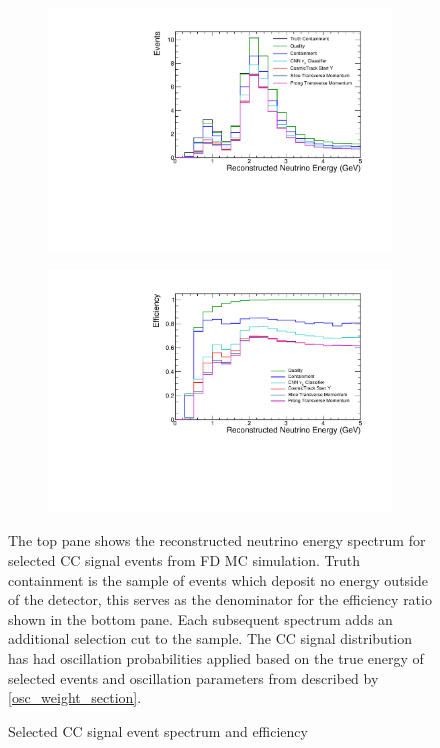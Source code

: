 \begin{figure}
\vspace{-30pt}
\begin{center}
  \begin{subfigure}[b]{0.7\textwidth}
    \centering
    \includegraphics[width=\textwidth]{figures/selection/myflow_sig_osc.pdf}
  \end{subfigure}

  \begin{subfigure}[b]{0.7\textwidth}
    \centering
    \includegraphics[width=\textwidth]{figures/selection/myflow_sig_eff_osc.pdf}
  \end{subfigure}

\end{center}
\vspace{-10pt}
\caption{Selected \numu CC signal event spectrum and efficiency}{
The top pane shows the reconstructed neutrino energy spectrum
for selected \numu CC signal events from FD MC simulation.
Truth containment is the sample of events which deposit
no energy outside of the detector, this serves as the denominator
for the efficiency ratio shown in the bottom pane.
Each subsequent spectrum adds an additional selection cut to the sample.
The \numu CC signal distribution has had oscillation probabilities applied
based on the true energy of selected events and oscillation parameters
from described by \ref{osc_weight_section}.
}
\label{cut_flow_sig}
\end{figure}


